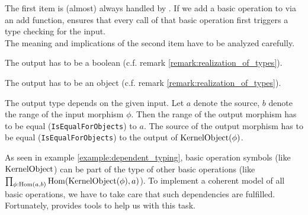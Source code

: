 The first item is (almost) always handled by \CapPkg.
If we add a basic operation to \CapPkg via an add function, \CapPkg ensures that every call of that
basic operation first triggers a type checking for the input.
\\
The meaning and implications of the second item have to be analyzed carefully.
\begin{example}
 The output has to be a boolean (c.f. remark \ref{remark:realization_of_types}).
\end{example}

\begin{example}
 The output has to be an object (c.f. remark \ref{remark:realization_of_types}).
\end{example}

\begin{example}[\ref{example:dependent_typing}]
 The output type depends on the given input. Let $a$ denote the source, $b$ denote the range of the input morphism $\phi$.
 Then the range of the output morphism has to be equal (\texttt{IsEqualForObjects}) to $a$.
 The source of the output morphism has to be equal (\texttt{IsEqualForObjects}) to the output of $\mathrm{KernelObject}(\phi)$.
\end{example}

As seen in example \ref{example:dependent_typing}, basic operation symbols (like $\mathrm{KernelObject}$) can be part of
the type of other basic operations (like $\prod_{\phi: \operatorname{\mathrm{Hom}}(a,b)} \operatorname{\mathrm{Hom}}( \mathrm{KernelObject}(\phi), a )$).
To implement a coherent model of all basic operations, we have to take care that such dependencies are fulfilled.
Fortunately, \CapPkg provides tools to help us with this task.


